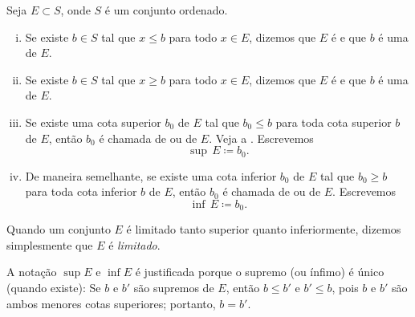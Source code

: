 \begin{defn}
Seja $E \subset S$, onde $S$ é um conjunto ordenado.
\begin{enumerate}[(i)]
\item Se existe $b \in S$ tal que $x \leq b$ para todo $x \in E$,
dizemos que $E$ é \emph{} e que $b$
é uma \emph{} de $E$.
\item Se existe $b \in S$ tal que $x \geq b$ para todo $x \in E$,
dizemos que $E$ é \emph{} e que $b$
é uma \emph{} de $E$.
\item Se existe uma cota superior $b_0$ de $E$ tal que
$b_0 \leq b$ para toda cota superior $b$ de $E$, então
$b_0$ é chamada de \emph{} ou
\emph{}
de $E$. Veja a . Escrevemos
\begin{equation*}
\sup\, E \coloneqq b_0 .
\end{equation*}
\item De maneira semelhante, se existe uma cota inferior $b_0$ de $E$ tal que
$b_0 \geq b$ para toda cota inferior $b$ de $E$, então
$b_0$ é chamada de \emph{} ou
\emph{}
de $E$. Escrevemos
\begin{equation*}
\inf\, E \coloneqq b_0 .
\end{equation*}
\end{enumerate}
Quando um conjunto $E$ é limitado tanto superior quanto inferiormente,
dizemos simplesmente que $E$ é \emph{limitado}.
\end{defn}

A notação $\sup E$ e $\inf E$ é justificada porque o
supremo (ou ínfimo) é único (quando existe): Se $b$ e
$b'$ são supremos de $E$, então $b \leq b'$ e $b' \leq b$, pois $b$ e $b'$ são ambos menores cotas superiores; portanto, $b=b'$.


\begin{myfigureht}
\caption{Um conjunto $E$ limitado superiormente e a menor cota superior de $E$.\label{fig:lub}}
\end{myfigureht}

